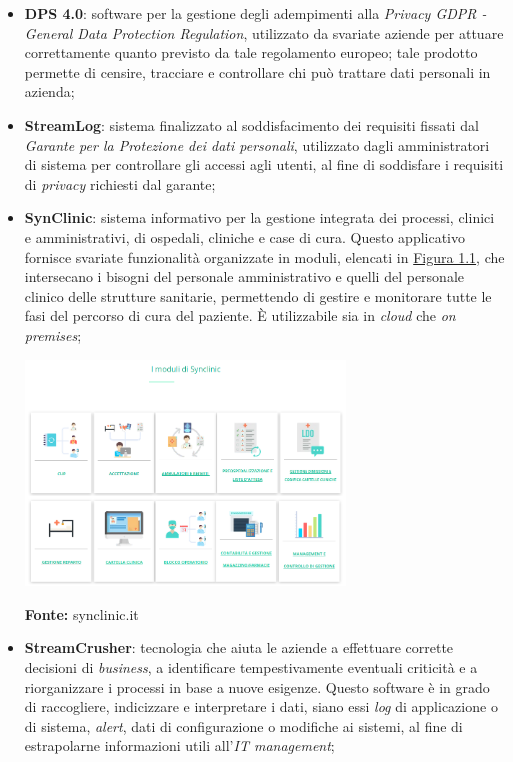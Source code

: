 \begin{itemize}
  \item \textbf{DPS 4.0}: software per la gestione degli adempimenti alla \textit{Privacy GDPR - General Data Protection Regulation}, utilizzato da svariate aziende per attuare correttamente quanto previsto da tale regolamento europeo; tale prodotto permette di censire, tracciare e controllare chi può trattare dati personali in azienda;

  \item \textbf{StreamLog}: sistema finalizzato al soddisfacimento dei requisiti fissati dal \textit{Garante per la Protezione dei dati personali}, utilizzato dagli amministratori di sistema per controllare gli accessi agli utenti, al fine di soddisfare i requisiti di \textit{privacy} richiesti dal garante;

  \item \textbf{SynClinic}: sistema informativo per la gestione integrata dei processi, clinici e amministrativi, di ospedali, cliniche e case di cura. Questo applicativo fornisce svariate funzionalità organizzate in moduli, elencati in \hyperref[img:synclinic]{Figura 1.1}, che intersecano i bisogni del personale amministrativo e quelli del personale clinico delle strutture sanitarie, permettendo di gestire e monitorare tutte le fasi del percorso di cura del paziente. È utilizzabile sia in \textit{cloud} che \textit{on premises};

  \begin{minipage}{\linewidth}
    \centering
      \includegraphics[height=6cm]{immagini/synclinic}
          \label{img:synclinic}
    \caption*{\textbf{Fonte:} synclinic.it}
  \end{minipage}

  \item \textbf{StreamCrusher}: tecnologia che aiuta le aziende a effettuare corrette decisioni di \textit{business}, a identificare tempestivamente eventuali criticità e a riorganizzare i processi in base a nuove esigenze. Questo software è in grado di raccogliere, indicizzare e interpretare i dati, siano essi \textit{log} di applicazione o di sistema, \textit{alert}, dati di configurazione o modifiche ai sistemi, al fine di estrapolarne informazioni utili all'\textit{IT management};


\end{itemize}
